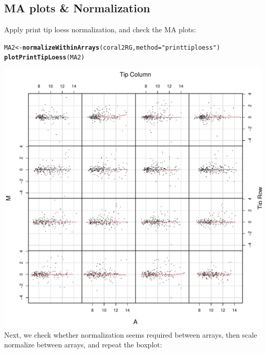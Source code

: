 \documentclass[a4paper,9pt]{article}\usepackage[]{graphicx}\usepackage[]{xcolor}
\makeatletter
\def\maxwidth{ %
  \ifdim\Gin@nat@width>\linewidth
    \linewidth
  \else
    \Gin@nat@width
  \fi
}
\newcommand{\hlstr}[1]{\textcolor[rgb]{0.192,0.494,0.8}{#1}}%
\newcommand{\hlstd}[1]{\textcolor[rgb]{0.345,0.345,0.345}{#1}}%
\newcommand{\hlkwb}[1]{\textcolor[rgb]{0.69,0.353,0.396}{#1}}%
\newcommand{\hlkwc}[1]{\textcolor[rgb]{0.333,0.667,0.333}{#1}}%
\newcommand{\hlkwd}[1]{\textcolor[rgb]{0.737,0.353,0.396}{\textbf{#1}}}%
\newenvironment{kframe}{%
 \def\at@end@of@kframe{}%
 \ifinner\ifhmode%
  \def\at@end@of@kframe{\end{minipage}}%
  \begin{minipage}{\columnwidth}%
 \fi\fi%
 \def\FrameCommand##1{\hskip\@totalleftmargin \hskip-\fboxsep
 \colorbox{shadecolor}{##1}\hskip-\fboxsep
     \hskip-\linewidth \hskip-\@totalleftmargin \hskip\columnwidth}%
 \MakeFramed {\advance\hsize-\width
   \@totalleftmargin\z@ \linewidth\hsize
   \@setminipage}}%
 {\par\unskip\endMakeFramed%
 \at@end@of@kframe}
\newenvironment{knitrout}{}{} %
\makeatother
\begin{document}
\subsection{MA plots \& Normalization}
Apply print tip loess normalization, and check the MA plots:
\begin{knitrout}
\color{fgcolor}\begin{kframe}
\begin{alltt}
\hlstd{MA2} \hlkwb{<-} \hlkwd{normalizeWithinArrays}\hlstd{(coral2RG,} \hlkwc{method} \hlstd{=} \hlstr{"printtiploess"}\hlstd{)}
\hlkwd{plotPrintTipLoess}\hlstd{(MA2)}
\end{alltt}
\end{kframe}
\includegraphics[width=\maxwidth]{figure/unnamed-chunk-21-1} 
\end{knitrout}
Next, we check whether normalization seems required between arrays,
then scale normalize between arrays, and repeat the boxplot:
\end{document}
